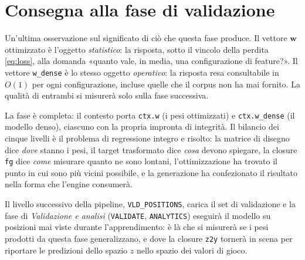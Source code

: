 \section{Consegna alla fase di validazione}

Un'ultima osservazione sul significato di ciò che questa fase produce. Il
vettore $\bm{w}$ ottimizzato è l'oggetto \emph{statistico}: la risposta,
sotto il vincolo della perdita \eqref{eq:loss}, alla domanda «quanto vale, in
media, una configurazione di feature?». Il vettore \texttt{w\_dense} è lo
stesso oggetto \emph{operativo}: la risposta resa consultabile in $O(1)$ per
ogni configurazione, incluse quelle che il corpus non ha mai fornito. La
qualità di entrambi si misurerà solo sulla fase successiva.

La fase è completa: il contesto porta \texttt{ctx.w} (i pesi ottimizzati) e
\texttt{ctx.w\_dense} (il modello denso), ciascuno con la propria impronta
di integrità. Il bilancio dei cinque livelli è il problema di regressione
integro e risolto: la matrice di disegno dice \emph{dove} stanno i pesi, il
target trasformato dice \emph{cosa} devono spiegare, la closure
\texttt{fg} dice \emph{come} misurare quanto ne sono lontani,
l'ottimizzazione ha trovato il punto in cui sono più vicini possibile, e la
generazione ha confezionato il risultato nella forma che l'engine consumerà.

Il livello successivo della pipeline, \texttt{VLD\_POSITIONS}, carica il set
di validazione e la fase di \emph{Validazione e analisi}
(\texttt{VALIDATE}, \texttt{ANALYTICS}) eseguirà il modello su posizioni mai
viste durante l'apprendimento: è là che si misurerà se i pesi prodotti da
questa fase generalizzano, e dove la closure \texttt{z2y} tornerà in scena
per riportare le predizioni dello spazio $z$ nello spazio dei valori di gioco.
